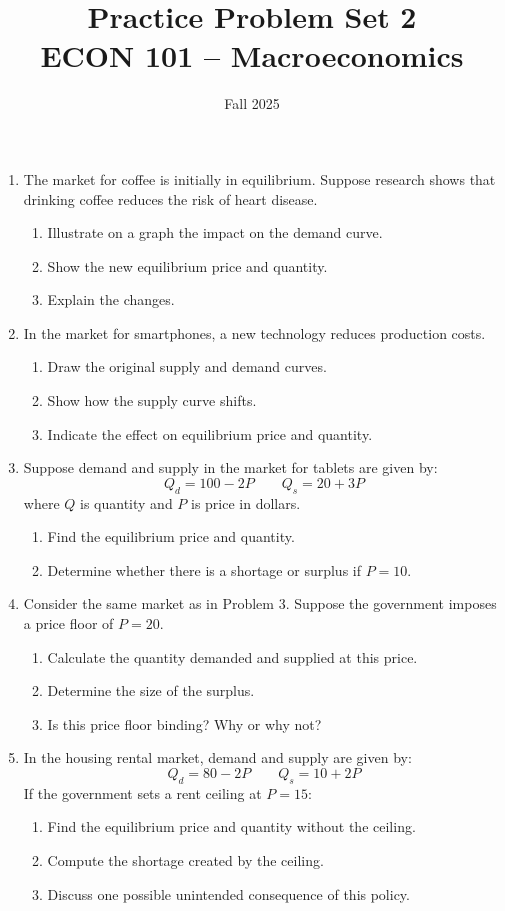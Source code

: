 \documentclass[12pt]{article}
\title{Practice Problem Set 2\\ \vspace{15pt} \large ECON 101 -- Macroeconomics}
\author{}
\date{Fall 2025}
\begin{document}
\maketitle


\begin{enumerate}



\item
The market for coffee is initially in equilibrium. Suppose research shows that drinking coffee reduces the risk of heart disease.
\begin{enumerate}
    \item Illustrate on a graph the impact on the demand curve.
    \item Show the new equilibrium price and quantity.
    \item Explain the changes.
\end{enumerate}

\item
In the market for smartphones, a new technology reduces production costs.
\begin{enumerate}
    \item Draw the original supply and demand curves.
    \item Show how the supply curve shifts.
    \item Indicate the effect on equilibrium price and quantity.
\end{enumerate}

\item
Suppose demand and supply in the market for tablets are given by:
\[
Q_d = 100 - 2P \quad \quad Q_s = 20 + 3P
\]
where \(Q\) is quantity and \(P\) is price in dollars.
\begin{enumerate}
    \item Find the equilibrium price and quantity.
    \item Determine whether there is a shortage or surplus if \(P = 10\).
\end{enumerate}

\item
Consider the same market as in Problem 3. Suppose the government imposes a price floor of \(P = 20\).
\begin{enumerate}
    \item Calculate the quantity demanded and supplied at this price.
    \item Determine the size of the surplus.
    \item Is this price floor binding? Why or why not?
\end{enumerate}
\newpage
\item
In the housing rental market, demand and supply are given by:
\[
Q_d = 80 - 2P \quad \quad Q_s = 10 + 2P
\]
If the government sets a rent ceiling at \(P = 15\):
\begin{enumerate}
    \item Find the equilibrium price and quantity without the ceiling.
    \item Compute the shortage created by the ceiling.
    \item Discuss one possible unintended consequence of this policy.
\end{enumerate}





\end{enumerate}
\end{document}
